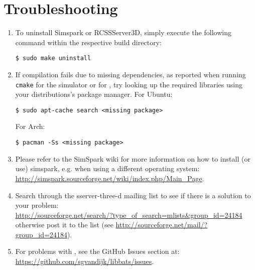 \section{Troubleshooting}
\begin{enumerate}
\item To uninstall Simspark or RCSSServer3D, simply execute the
  following command within the respective build directory:
\begin{verbatim}
$ sudo make uninstall
\end{verbatim}
\item If compilation fails due to missing dependencies, as reported
  when running {\tt cmake} for the simulator or for
  \libbats, try looking up the required libraries using your
  distributions's package manager. For Ubuntu:
\begin{verbatim}
$ sudo apt-cache search <missing package>
\end{verbatim}
  For Arch:
\begin{verbatim}
$ pacman -Ss <missing package>
\end{verbatim}
\item Please refer to the SimSpark wiki for more information on how to
  install (or use) simspark, e.g. when using a different operating
  system:\\
  \url{http://simspark.sourceforge.net/wiki/index.php/Main_Page}.
\item Search through the sserver-three-d mailing list to see if there
  is a solution to your problem:\\
  \url{http://sourceforge.net/search/?type_of_search=mlists&group_id=24184}\\
  otherwise post it to the list (see
  \url{http://sourceforge.net/mail/?group_id=24184}).
\item For problems with \libbats, see the GitHub Issues section at: \\
  \url{https://github.com/sgvandijk/libbats/issues}.
\end{enumerate}
